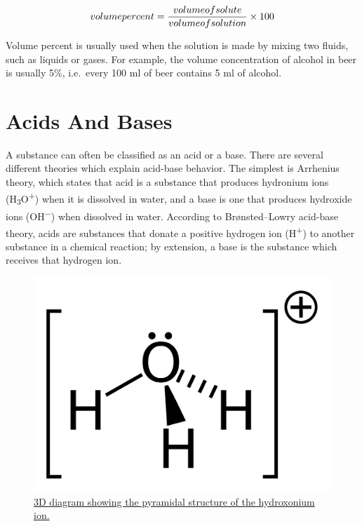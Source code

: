\[ volume \space percent=\frac{volume \space of \space solute}{volume \space of \space solution} \times 100 \]

Volume percent is usually used when the solution is made by mixing two fluids, such as liquids or gases. For example, the volume concentration of alcohol in beer is usually 5\%, i.e.~every 100 ml of beer contains 5 ml of alcohol.


\hypertarget{acids-and-bases}{%
\section{Acids And Bases}\label{acids-and-bases}}

A substance can often be classified as an acid or a base. There are several different theories which explain acid-base behavior. The simplest is Arrhenius theory, which states that acid is a substance that produces hydronium ions (H\textsubscript{3}O\textsuperscript{+}) when it is dissolved in water, and a base is one that produces hydroxide ions (OH\textsuperscript{−}) when dissolved in water. According to Brønsted--Lowry acid-base theory, acids are substances that donate a positive hydrogen ion (H\textsuperscript{+}) to another substance in a chemical reaction; by extension, a base is the substance which receives that hydrogen ion.



\begin{figure}

{\centering \includegraphics[width=0.7\linewidth]{./figures/chemistry/Hydroxonium-cation} 

}

\caption{\href{https://commons.wikimedia.org/wiki/File:Hydroxonium-cation.svg}{3D diagram showing the pyramidal structure of the hydroxonium ion.}}\label{fig:hydroxoniumion}
\end{figure}



